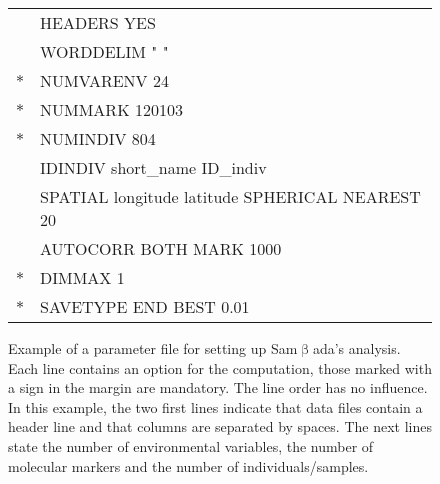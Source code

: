 \documentclass[a4paper,11pt]{article}
\newcommand{\smb}{\textsf{Sam$\upbeta$ada}}
\begin{document}
\begin{figure}[htbp]
\centering
%
{
\ttfamily
\begin{tabular}{c|l|}
\cline{2-2}
& HEADERS YES\\	
& WORDDELIM " "\\	
$\ast$ & NUMVARENV 24\\	
$\ast$ & NUMMARK 120103	\\
$\ast$ & NUMINDIV 804\\
& IDINDIV short\_name ID\_indiv\\
& SPATIAL longitude latitude SPHERICAL NEAREST 20  \\
& AUTOCORR BOTH MARK 1000\\
$\ast$ & DIMMAX 1\\
$\ast$ & SAVETYPE END BEST 0.01\\
\cline{2-2}
 \end{tabular}%
}
\caption[Exemple de fichier de paramètres pour \smb.]
{Example of a parameter file for setting up \smb's analysis.
Each line contains an option for the computation, those marked with a sign in the margin are mandatory.
The line order has no influence.
In this example, the two first lines indicate that data files contain a header line and that columns are separated by spaces.
The next lines state the number of environmental variables, the number of molecular markers and the number of individuals/samples.
}
\end{figure}
\end{document}
